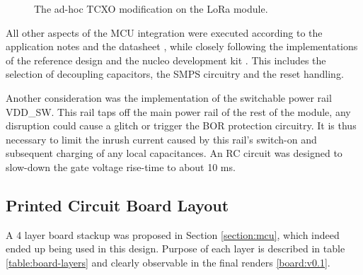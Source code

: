 \begin{figure}
    \centering
     \hfil
    \caption{\label{fig:tcxo-bodge}The ad-hoc TCXO modification on the LoRa module.}
\end{figure}

All other aspects of the MCU integration were executed according to the application notes and the datasheet  \cite{stmicroelectronics_stm32wle5xx_nodate,stmicroelectronics_how_nodate-1}, while closely following the implementations of the reference design and the nucleo development kit \cite{stmicroelectronics_stdes-wl5u4ilh_2024,stmicroelectronics_nucleo-wl55jc_2024}. This includes the selection of decoupling capacitors, the SMPS circuitry and the reset handling.

Another consideration was the implementation of the switchable power rail VDD\_SW. This rail taps off the main power rail of the rest of the module, any disruption could cause a glitch or trigger the BOR protection circuitry. It is thus necessary to limit the inrush current caused by this rail's switch-on and subsequent charging of any local capacitances. An RC circuit was designed to slow-down the gate voltage rise-time to about 10 ms.

\subsection{Printed Circuit Board Layout}
A 4 layer board stackup was proposed in Section \ref{section:mcu}, which indeed ended up being used in this design. Purpose of each layer is described in table \ref{table:board-layers} and clearly observable in the final renders \ref{board:v0.1}.

